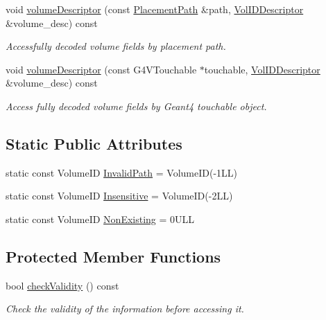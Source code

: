 \begin{DoxyCompactItemize}
void \hyperlink{class_d_d4hep_1_1_simulation_1_1_geant4_volume_manager_a7c95acc49bf21e766f289e8a9ebe6887}{volumeDescriptor} (const \hyperlink{class_d_d4hep_1_1_simulation_1_1_geant4_volume_manager_a990d8577e764541c4914263db1c6b0ca}{PlacementPath} \&path, \hyperlink{class_d_d4hep_1_1_simulation_1_1_geant4_volume_manager_aeedd11a516f671331ec2a46f5d39768d}{VolIDDescriptor} \&volume\_\-desc) const 
\begin{DoxyCompactList}\small\item\em Accessfully decoded volume fields by placement path. \item\end{DoxyCompactList}\item 
void \hyperlink{class_d_d4hep_1_1_simulation_1_1_geant4_volume_manager_a4ca06c3888aa4309011774646e73e925}{volumeDescriptor} (const G4VTouchable $\ast$touchable, \hyperlink{class_d_d4hep_1_1_simulation_1_1_geant4_volume_manager_aeedd11a516f671331ec2a46f5d39768d}{VolIDDescriptor} \&volume\_\-desc) const 
\begin{DoxyCompactList}\small\item\em Access fully decoded volume fields by Geant4 touchable object. \item\end{DoxyCompactList}\end{DoxyCompactItemize}
\subsection*{Static Public Attributes}
\begin{DoxyCompactItemize}
\item 
static const VolumeID \hyperlink{class_d_d4hep_1_1_simulation_1_1_geant4_volume_manager_a7a52a387bf1165cc296e76eeda618e9c}{InvalidPath} = VolumeID(-\/1LL)
\item 
static const VolumeID \hyperlink{class_d_d4hep_1_1_simulation_1_1_geant4_volume_manager_a3cd1e1946cee2db0e8a5a8240c9095be}{Insensitive} = VolumeID(-\/2LL)
\item 
static const VolumeID \hyperlink{class_d_d4hep_1_1_simulation_1_1_geant4_volume_manager_a21aa25818681febe8658db66aa94b89c}{NonExisting} = 0ULL
\end{DoxyCompactItemize}
\subsection*{Protected Member Functions}
\begin{DoxyCompactItemize}
\item 
bool \hyperlink{class_d_d4hep_1_1_simulation_1_1_geant4_volume_manager_aeaa8e42fc31052407236690c59029580}{checkValidity} () const 
\begin{DoxyCompactList}\small\item\em Check the validity of the information before accessing it. \item\end{DoxyCompactList}\end{DoxyCompactItemize}
